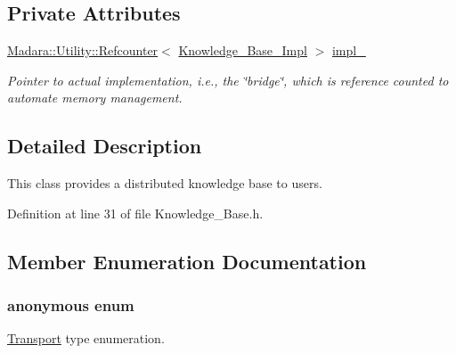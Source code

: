 \subsection*{Private Attributes}
\begin{DoxyCompactItemize}
\item 
\hyperlink{classMadara_1_1Utility_1_1Refcounter}{Madara::Utility::Refcounter}$<$ \hyperlink{classMadara_1_1Knowledge__Engine_1_1Knowledge__Base__Impl}{Knowledge\_\-Base\_\-Impl} $>$ \hyperlink{classMadara_1_1Knowledge__Engine_1_1Knowledge__Base_acf0e941dec72247fa5465ce79d051c6b}{impl\_\-}
\begin{DoxyCompactList}\small\item\em Pointer to actual implementation, i.e., the \char`\"{}bridge\char`\"{}, which is reference counted to automate memory management. \item\end{DoxyCompactList}\end{DoxyCompactItemize}


\subsection{Detailed Description}
This class provides a distributed knowledge base to users. 

Definition at line 31 of file Knowledge\_\-Base.h.



\subsection{Member Enumeration Documentation}
\hypertarget{classMadara_1_1Knowledge__Engine_1_1Knowledge__Base_a509265a70e9c117d273fcb33fc7815a8}{
\subsubsection[{"@4}]{\setlength{\rightskip}{0pt plus 5cm}anonymous enum}}
\label{df/d02/classMadara_1_1Knowledge__Engine_1_1Knowledge__Base_a509265a70e9c117d273fcb33fc7815a8}


\hyperlink{namespaceMadara_1_1Transport}{Transport} type enumeration. 

